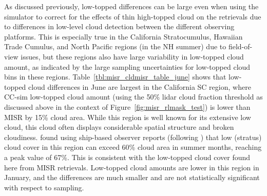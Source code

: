 As discussed previously, low-topped differences can be large even when
using the simulator to correct for the effects of thin high-topped cloud
on the retrievals due to differences in low-level cloud detection
between the different observing platforms. This is especially true in
the California Stratocumulus, Hawaiian Trade Cumulus, and North Pacific
regions (in the NH summer) due to field-of-view issues, but these
regions also have large variability in low-topped cloud amount, as
indicated by the large sampling uncertainties for low-topped cloud bins
in these regions. Table~\ref{tbl:misr_cldmisr_table_june} shows that
low-topped cloud differences in June are largest in the California SC
region, where CC-sim low-topped cloud amount (using the 50\% lidar cloud
fraction threshold as discussed above in the context of
Figure~\ref{fig:misr_rlmask_test}) is lower than MISR by 15\% cloud
area. While this region is well known for its extensive low cloud, this
cloud often displays considerable spatial structure and broken
cloudiness. \citet{klein_and_hartmann_1993} found using ship-based
observer reports (following \citeauthor{warren_et_al_1986}
\citetext{\citeyear{warren_et_al_1986}; \citealp{warren_et_al_1988}})
that low (stratus) cloud cover in this region can exceed 60\% cloud area
in summer months, reaching a peak value of 67\%. This is consistent with
the low-topped cloud cover found here from MISR retrievals. Low-topped
cloud amounts are lower in this region in January, and the differences
are much smaller and are not statistically significant with respect to
sampling.

